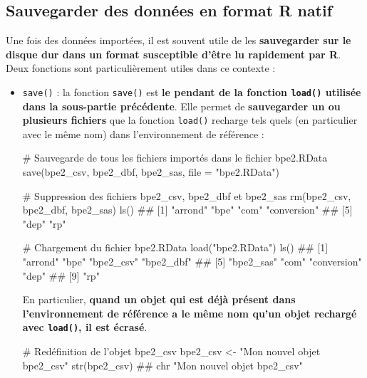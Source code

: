 \documentclass[12pt,twosided, notitlepage]{book}
\newenvironment{Shaded}{}{}
\newcommand{\KeywordTok}[1]{\textcolor[rgb]{0.00,0.00,1.00}{{#1}}}
\newcommand{\DataTypeTok}[1]{{#1}}
\newcommand{\StringTok}[1]{\textcolor[rgb]{0.00,0.50,0.50}{{#1}}}
\newcommand{\CommentTok}[1]{\textcolor[rgb]{0.00,0.50,0.00}{{#1}}}
\newcommand{\NormalTok}[1]{{#1}}
\renewenvironment{Shaded}{\begin{snugshade}}{\end{snugshade}}
\begin{document}
\subsection{Sauvegarder des données en format R
natif}\label{sauvegarder-des-donnees-en-format-r-natif}

Une fois des données importées, il est souvent utile de les
\textbf{sauvegarder sur le disque dur dans un format susceptible d'être
lu rapidement par R}. Deux fonctions sont particulièrement utiles dans
ce contexte :

\begin{itemize}
\item
  \texttt{save()} : la fonction
  \texttt{save()} est \textbf{le pendant de la fonction \texttt{load()}
  utilisée dans la sous-partie précédente}. Elle permet de
  \textbf{sauvegarder un ou plusieurs fichiers} que la fonction
  \texttt{load()} recharge tels quels (en
  particulier avec le même nom) dans l'environnement de référence :

\begin{Shaded}
\begin{Highlighting}[]
\CommentTok{# Sauvegarde de tous les fichiers importés dans le fichier bpe2.RData}
\KeywordTok{save}\NormalTok{(bpe2_csv, bpe2_dbf, bpe2_sas, }\DataTypeTok{file =} \StringTok{"bpe2.RData"}\NormalTok{)}

\CommentTok{# Suppression des fichiers bpe2_csv, bpe2_dbf et bpe2_sas}
\KeywordTok{rm}\NormalTok{(bpe2_csv, bpe2_dbf, bpe2_sas)}
\KeywordTok{ls}\NormalTok{()}
  \NormalTok{## [1] "arrond"     "bpe"        "com"        "conversion"}
  \NormalTok{## [5] "dep"        "rp"}

\CommentTok{# Chargement du fichier bpe2.RData}
\KeywordTok{load}\NormalTok{(}\StringTok{"bpe2.RData"}\NormalTok{)}
\KeywordTok{ls}\NormalTok{()}
  \NormalTok{## [1] "arrond"     "bpe"        "bpe2_csv"   "bpe2_dbf"  }
  \NormalTok{## [5] "bpe2_sas"   "com"        "conversion" "dep"       }
  \NormalTok{## [9] "rp"}
\end{Highlighting}
\end{Shaded}

  En particulier, \textbf{quand un objet qui est déjà présent dans
  l'environnement de référence a le même nom qu'un objet rechargé avec
  \texttt{load()}, il est écrasé}.

\begin{Shaded}
\begin{Highlighting}[]
\CommentTok{# Redéfinition de l'objet bpe2_csv}
\NormalTok{bpe2_csv <-}\StringTok{ "Mon nouvel objet bpe2_csv"}
\KeywordTok{str}\NormalTok{(bpe2_csv)}
  \NormalTok{##  chr "Mon nouvel objet bpe2_csv"}


\end{Highlighting}
\end{Shaded}
\end{itemize}
\end{document}
